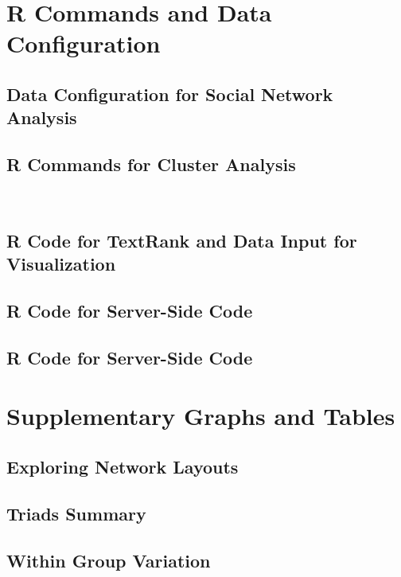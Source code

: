 \documentclass[11pt]{article}
\begin{document}
\singlespacing



\section{R Commands and Data Configuration} \label{App:AppendixA}
\subsection{Data Configuration for Social Network Analysis}

\subsection{R Commands for Cluster Analysis}
\
\subsection{R Code for TextRank and Data Input for Visualization}

\subsection{R Code for Server-Side Code}

\subsection{R Code for Server-Side Code}


\section{Supplementary Graphs and Tables} \label{App:AppendixB}
\subsection{Exploring Network Layouts}

\subsection{Triads Summary}

\subsection{Within Group Variation}

\end{document}
